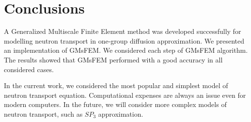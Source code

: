 \documentclass[10pt]{article}
\begin{document}
\section{Conclusions}
A Generalized Multiscale Finite Element method was developed successfully for modelling neutron transport in one-group diffusion approximation.  
We presented an implementation of GMsFEM. 
We considered each step of GMsFEM algorithm.
The results showed that GMsFEM performed with a good accuracy in all considered cases.

In the current work, we considered the most popular and simplest model of neutron transport equation.
Computational expenses are always an issue even for modern computers.
In the future, we will consider more complex models of neutron transport, such as $SP_3$ approximation. 

\end{document}
